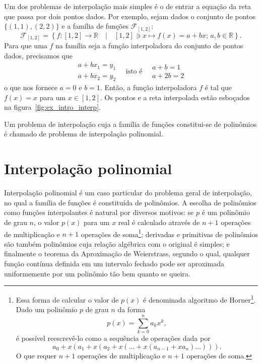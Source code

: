 \begin{ex}\label{ex:intro_interpolacao}
  Um dos problemas de interpolação mais simples é o de entrar a equação da reta que passa por dois pontos dados. Por exemplo, sejam dados o conjunto de pontos $\{(1, 1), (2, 2)\}$ e a família de funções $\mathcal{F}_{[1,2]}$:
  \begin{equation*}
   \mathcal{F}_{[1,2]} = \left\{f:[1,2]\rightarrow \mathbb{R}\quad|\quad[1,2]\ni x\mapsto f(x) = a + bx;\,a,b\in\mathbb{R}\right\}.
  \end{equation*}
  Para que uma $f$ na família seja a função interpoladora do conjunto de pontos dados, precisamos que
  \begin{equation*}
    \begin{array}{l}
      a + bx_1 = y_1\\
      a + bx_2 = y_2
    \end{array}\quad\text{isto é}\quad
    \begin{array}{l}
      a + b = 1\\
      a + 2b = 2
    \end{array}
  \end{equation*}
o que nos fornece $a = 0$ e $b = 1$. Então, a função interpoladora $f$ é tal que  $f(x) = x$ para um $x\in[1,2]$. Os pontos e a reta interpolada estão esboçados na figura~\ref{fig:ex_intro_interp}.
\end{ex}

Um problema de interpolação cuja a família de funções constitui-se de polinômios é chamado de problema de interpolação polinomial.

\section{Interpolação polinomial}

Interpolação polinomial é um caso particular do problema geral de interpolação, no qual a família de funções é constituída de polinômios. A escolha de polinômios como funções interpolantes é natural por diversos  motivos: se $p$ é um polinômio de grau $n$, o valor $p(x)$ para um $x$ real é calculado através de $n+1$ operações de multiplicação e $n+1$ operações de soma\footnote{Essa forma de calcular o valor de $p(x)$ é denominada algoritmo de Horner\footnote{William George Horner, 1786 - 1837, matemático britânico.}. Dado um polinômio $p$ de grau $n$ da forma \begin{equation*}p(x)=\sum_{k=0}^{n}a_k x^k,\end{equation*} é possível reescrevê-lo como a sequência de operações dada por \begin{equation*}a_0 + x\left(a_1 + x\left(a_2 + x\left(\ldots + x\left(a_{n-1} + x a_n\right)\ldots\right)\right)\right).\end{equation*} O que requer $n+1$ operações de multiplicação e $n+1$ operações de soma.}; derivadas e primitivas de polinômios são também polinômios cuja relação algébrica com o original é simples; e finalmente o teorema da Aproximação de Weierstrass, segundo o qual, qualquer função contínua definida em um intervalo fechado pode ser aproximada uniformemente por um polinômio tão bem quanto se queira.  

